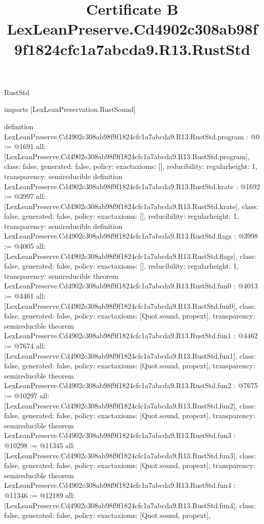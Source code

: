 \begin{lexlean}{RustStd}
\title{Certificate B LexLeanPreserve.Cd4902c308ab98f9f1824cfc1a7abcda9.R13.RustStd}
\begin{coremodule}
imports [LexLeanPreservation.RustSound]

definition LexLeanPreserve.Cd4902c308ab98f9f1824cfc1a7abcda9.R13.RustStd.program : @0 := @1691 {
  all: [LexLeanPreserve.Cd4902c308ab98f9f1824cfc1a7abcda9.R13.RustStd.program],
  class: false,
  generated: false,
  policy: exact{axioms: []},
  reducibility: regular{height: 1},
  transparency: semireducible
}
definition LexLeanPreserve.Cd4902c308ab98f9f1824cfc1a7abcda9.R13.RustStd.krate : @1692 := @3997 {
  all: [LexLeanPreserve.Cd4902c308ab98f9f1824cfc1a7abcda9.R13.RustStd.krate],
  class: false,
  generated: false,
  policy: exact{axioms: []},
  reducibility: regular{height: 1},
  transparency: semireducible
}
definition LexLeanPreserve.Cd4902c308ab98f9f1824cfc1a7abcda9.R13.RustStd.flags : @3998 := @4005 {
  all: [LexLeanPreserve.Cd4902c308ab98f9f1824cfc1a7abcda9.R13.RustStd.flags],
  class: false,
  generated: false,
  policy: exact{axioms: []},
  reducibility: regular{height: 1},
  transparency: semireducible
}
theorem LexLeanPreserve.Cd4902c308ab98f9f1824cfc1a7abcda9.R13.RustStd.fun0 : @4013 := @4461 {
  all: [LexLeanPreserve.Cd4902c308ab98f9f1824cfc1a7abcda9.R13.RustStd.fun0],
  class: false,
  generated: false,
  policy: exact{axioms: [Quot.sound, propext]},
  transparency: semireducible
}
theorem LexLeanPreserve.Cd4902c308ab98f9f1824cfc1a7abcda9.R13.RustStd.fun1 : @4462 := @7674 {
  all: [LexLeanPreserve.Cd4902c308ab98f9f1824cfc1a7abcda9.R13.RustStd.fun1],
  class: false,
  generated: false,
  policy: exact{axioms: [Quot.sound, propext]},
  transparency: semireducible
}
theorem LexLeanPreserve.Cd4902c308ab98f9f1824cfc1a7abcda9.R13.RustStd.fun2 : @7675 := @10297 {
  all: [LexLeanPreserve.Cd4902c308ab98f9f1824cfc1a7abcda9.R13.RustStd.fun2],
  class: false,
  generated: false,
  policy: exact{axioms: [Quot.sound, propext]},
  transparency: semireducible
}
theorem LexLeanPreserve.Cd4902c308ab98f9f1824cfc1a7abcda9.R13.RustStd.fun3 : @10298 := @11345 {
  all: [LexLeanPreserve.Cd4902c308ab98f9f1824cfc1a7abcda9.R13.RustStd.fun3],
  class: false,
  generated: false,
  policy: exact{axioms: [Quot.sound, propext]},
  transparency: semireducible
}
theorem LexLeanPreserve.Cd4902c308ab98f9f1824cfc1a7abcda9.R13.RustStd.fun4 : @11346 := @12189 {
  all: [LexLeanPreserve.Cd4902c308ab98f9f1824cfc1a7abcda9.R13.RustStd.fun4],
  class: false,
  generated: false,
  policy: exact{axioms: [Quot.sound, propext]},
}
\end{coremodule}
\end{lexlean}
